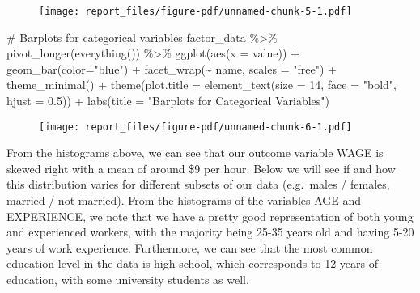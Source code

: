 \documentclass[
  letterpaper,
  DIV=11,
  numbers=noendperiod]{scrartcl}
\newenvironment{Shaded}{\begin{snugshade}}{\end{snugshade}}
\newcommand{\AttributeTok}[1]{\textcolor[rgb]{0.40,0.45,0.13}{#1}}
\newcommand{\CommentTok}[1]{\textcolor[rgb]{0.37,0.37,0.37}{#1}}
\newcommand{\DecValTok}[1]{\textcolor[rgb]{0.68,0.00,0.00}{#1}}
\newcommand{\FloatTok}[1]{\textcolor[rgb]{0.68,0.00,0.00}{#1}}
\newcommand{\FunctionTok}[1]{\textcolor[rgb]{0.28,0.35,0.67}{#1}}
\newcommand{\NormalTok}[1]{\textcolor[rgb]{0.00,0.23,0.31}{#1}}
\newcommand{\SpecialCharTok}[1]{\textcolor[rgb]{0.37,0.37,0.37}{#1}}
\newcommand{\StringTok}[1]{\textcolor[rgb]{0.13,0.47,0.30}{#1}}
\begin{document}
\begin{figure}[H]

{\centering \texttt{[image: report\_files/figure-pdf/unnamed-chunk-5-1.pdf]}

}

\end{figure}

\begin{Shaded}
\begin{Highlighting}[]
\CommentTok{\# Barplots for categorical variables}
\NormalTok{factor\_data }\SpecialCharTok{\%\textgreater{}\%}
  \FunctionTok{pivot\_longer}\NormalTok{(}\FunctionTok{everything}\NormalTok{()) }\SpecialCharTok{\%\textgreater{}\%}
  \FunctionTok{ggplot}\NormalTok{(}\FunctionTok{aes}\NormalTok{(}\AttributeTok{x =}\NormalTok{ value)) }\SpecialCharTok{+}
  \FunctionTok{geom\_bar}\NormalTok{(}\AttributeTok{color=}\StringTok{"blue"}\NormalTok{) }\SpecialCharTok{+}
  \FunctionTok{facet\_wrap}\NormalTok{(}\SpecialCharTok{\textasciitilde{}}\NormalTok{ name, }\AttributeTok{scales =} \StringTok{"free"}\NormalTok{) }\SpecialCharTok{+}
  \FunctionTok{theme\_minimal}\NormalTok{() }\SpecialCharTok{+}
  \FunctionTok{theme}\NormalTok{(}\AttributeTok{plot.title =} \FunctionTok{element\_text}\NormalTok{(}\AttributeTok{size =} \DecValTok{14}\NormalTok{, }\AttributeTok{face =} \StringTok{"bold"}\NormalTok{, }\AttributeTok{hjust =} \FloatTok{0.5}\NormalTok{)) }\SpecialCharTok{+}
  \FunctionTok{labs}\NormalTok{(}\AttributeTok{title =} \StringTok{"Barplots for Categorical Variables"}\NormalTok{)}
\end{Highlighting}
\end{Shaded}

\begin{figure}[H]

{\centering \texttt{[image: report\_files/figure-pdf/unnamed-chunk-6-1.pdf]}

}

\end{figure}

From the histograms above, we can see that our outcome variable WAGE is
skewed right with a mean of around \$9 per hour. Below we will see if
and how this distribution varies for different subsets of our data
(e.g.~males / females, married / not married). From the histograms of
the variables AGE and EXPERIENCE, we note that we have a pretty good
representation of both young and experienced workers, with the majority
being 25-35 years old and having 5-20 years of work experience.
Furthermore, we can see that the most common education level in the data
is high school, which corresponds to 12 years of education, with some
university students as well.
\end{document}
